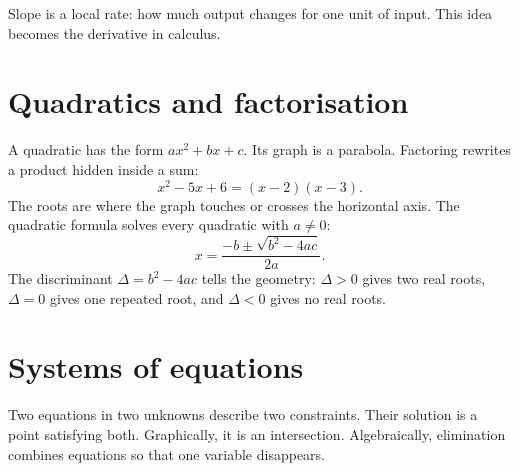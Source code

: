 \documentclass[11pt,oneside,openany]{book}
\begin{document}
Slope is a local rate: how much output changes for one unit of input. This idea becomes the derivative in calculus.

\section{Quadratics and factorisation}

A quadratic has the form $ax^2+bx+c$. Its graph is a parabola. Factoring rewrites a product hidden inside a sum:
\[
  x^2-5x+6=(x-2)(x-3).
\]
The roots are where the graph touches or crosses the horizontal axis. The quadratic formula solves every quadratic with $a\ne0$:
\[
  x=\frac{-b\pm\sqrt{b^2-4ac}}{2a}.
\]
The discriminant $\Delta=b^2-4ac$ tells the geometry: $\Delta>0$ gives two real roots, $\Delta=0$ gives one repeated root, and $\Delta<0$ gives no real roots.

\begin{center}
\end{center}

\section{Systems of equations}

Two equations in two unknowns describe two constraints. Their solution is a point satisfying both. Graphically, it is an intersection. Algebraically, elimination combines equations so that one variable disappears.

\begin{center}
\end{center}
\end{document}
